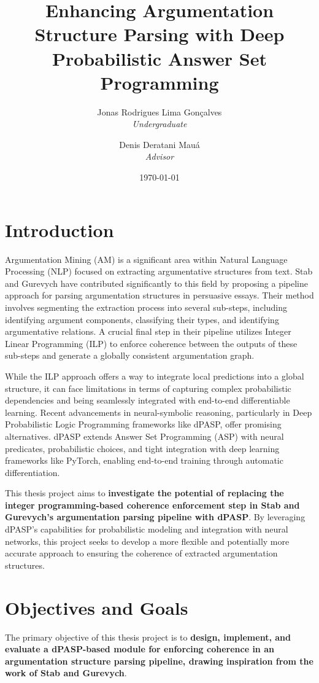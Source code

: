 \documentclass{article}
\title{Enhancing Argumentation Structure Parsing with Deep Probabilistic Answer
Set Programming}
\author{Jonas Rodrigues Lima Gonçalves \\ \textit{Undergraduate} \and
Denis Deratani Mauá \\ \textit{Advisor}}
\date{\today}
\begin{document}
\maketitle

\section{Introduction}

Argumentation Mining (AM) is a significant area within Natural Language
Processing (NLP) focused on extracting argumentative structures from text. Stab
and Gurevych have contributed significantly to this field by proposing a
pipeline approach for parsing argumentation structures in persuasive essays.
Their method involves segmenting the extraction process into several sub-steps,
including identifying argument components, classifying their types, and
identifying argumentative relations. A crucial final step in their pipeline
utilizes Integer Linear Programming (ILP) to enforce coherence between the
outputs of these sub-steps and generate a globally consistent argumentation
graph.

While the ILP approach offers a way to integrate local predictions into a global
structure, it can face limitations in terms of capturing complex probabilistic
dependencies and being seamlessly integrated with end-to-end differentiable
learning. Recent advancements in neural-symbolic reasoning, particularly in
Deep Probabilistic Logic Programming frameworks like dPASP, offer promising
alternatives. dPASP extends Answer Set Programming (ASP) with neural
predicates, probabilistic choices, and tight integration with deep learning
frameworks like PyTorch, enabling end-to-end training through automatic
differentiation.

This thesis project aims to \textbf{investigate the potential of replacing the
integer programming-based coherence enforcement step in Stab and Gurevych's
argumentation parsing pipeline with dPASP}. By leveraging dPASP's capabilities
for probabilistic modeling and integration with neural networks, this project
seeks to develop a more flexible and potentially more accurate approach to
ensuring the coherence of extracted argumentation structures.

\section{Objectives and Goals}

The primary objective of this thesis project is to \textbf{design, implement,
and evaluate a dPASP-based module for enforcing coherence in an argumentation
structure parsing pipeline, drawing inspiration from the work of Stab and
Gurevych}.
\end{document}
